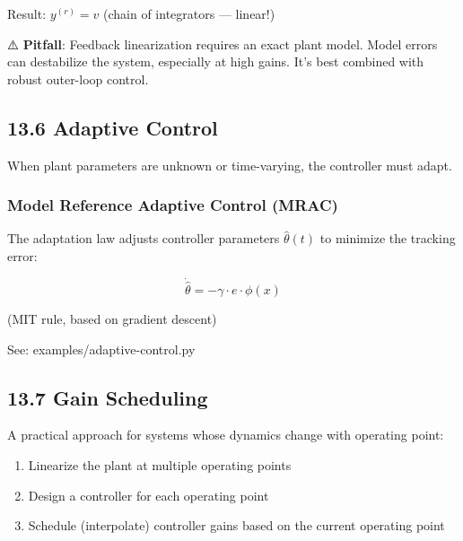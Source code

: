 \documentclass[11pt,a4paper]{book}
\begin{document}
\begin{itemize}
Result: $y^{(r)} = v$ (chain of integrators — linear!)

⚠️ \textbf{Pitfall}: Feedback linearization requires an exact plant model. Model errors can destabilize the system, especially at high gains. It's best combined with robust outer-loop control.

\medskip\noindent\hrulefill\medskip

\subsection{13.6 Adaptive Control}

When plant parameters are unknown or time-varying, the controller must adapt.

\subsubsection{Model Reference Adaptive Control (MRAC)}

The adaptation law adjusts controller parameters $\hat{\theta}(t)$ to minimize the tracking error:

\[\dot{\hat{\theta}} = -\gamma \cdot e \cdot \phi(x)\]

(MIT rule, based on gradient descent)

See: examples/adaptive-control.py

\medskip\noindent\hrulefill\medskip

\subsection{13.7 Gain Scheduling}

A practical approach for systems whose dynamics change with operating point:

\begin{enumerate}
\item Linearize the plant at multiple operating points
\item Design a controller for each operating point
\item Schedule (interpolate) controller gains based on the current operating point
\end{enumerate}


\end{itemize}
\end{document}
